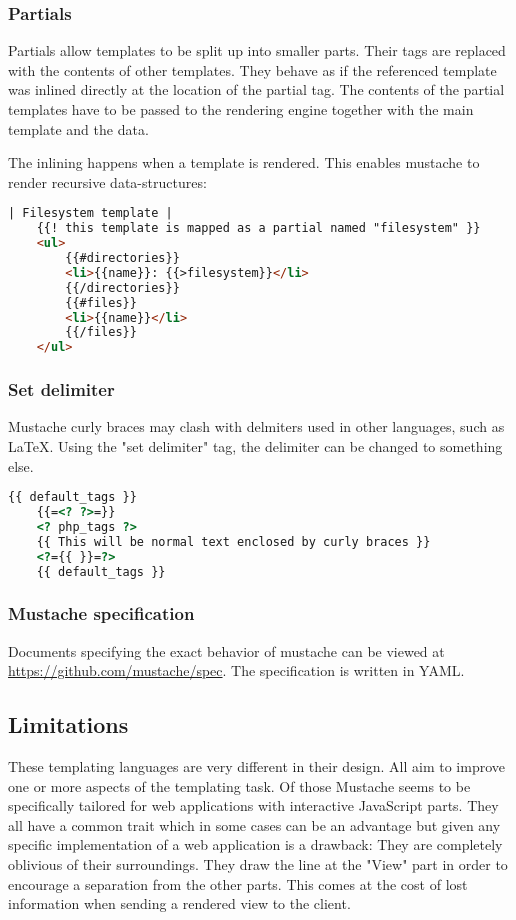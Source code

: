 \subsubsection{Partials}
Partials allow templates to be split up into smaller parts. Their tags are
replaced with the contents of other templates. They behave as if the referenced
template was inlined directly at the location of the partial tag.
The contents of the partial templates have to be passed to the rendering engine
together with the main template and the data.

The inlining happens when a template is rendered. This enables mustache to
render recursive data-structures:
\begin{lstlisting}[language=HTML]
	| Filesystem template |
	{{! this template is mapped as a partial named "filesystem" }}
	<ul>
		{{#directories}}
		<li>{{name}}: {{>filesystem}}</li>
		{{/directories}}
		{{#files}}
		<li>{{name}}</li>
		{{/files}}
	</ul>
\end{lstlisting}

\subsubsection{Set delimiter}
Mustache curly braces may clash with delmiters used in other languages,
such as LaTeX. Using the "set delimiter" tag, the delimiter can be changed to
something else.
\begin{lstlisting}[language=HTML]
	{{ default_tags }}
	{{=<? ?>=}}
	<? php_tags ?>
	{{ This will be normal text enclosed by curly braces }}
	<?={{ }}=?>
	{{ default_tags }}
\end{lstlisting}

\subsubsection{Mustache specification}
Documents specifying the exact behavior of mustache can be viewed at
\url{https://github.com/mustache/spec}. The specification is written in YAML.

\subsection{Limitations}
These templating languages are very different in their design.
All aim to improve one or more aspects of the templating task.
Of those Mustache seems to be specifically tailored for web applications
with interactive JavaScript parts.
They all have a common trait which in some cases can be an advantage
but given any specific implementation of a web application is a drawback:
They are completely oblivious of their surroundings. They draw the line
at the "View" part in order to encourage a separation from the other
parts. This comes at the cost of lost information when sending a
rendered view to the client.
